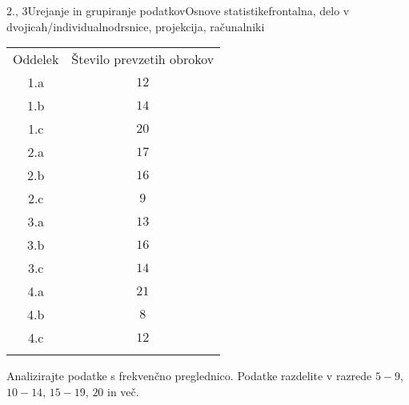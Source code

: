 \begin{priprava}{2., 3}{}{Urejanje in grupiranje podatkov}{Osnove statistike}{frontalna, delo v dvojicah/individualno}{drsnice, projekcija, računalniki}
\begin{naloga}
                            \begin{table}[H]
                                \centering
                                \begin{tabular}{||c|c||} 
                                \hhline{|t:==:t|}
                                \rowcolor[rgb]{0.843,0.718,0.718} 
                                Oddelek  & Število prevzetih obrokov   \\ 
                                \hhline{|:==:|}
                                1.a & $12$    \\ 
                                \hline
                                1.b & $14$    \\ 
                                \hline
                                1.c & $20$    \\ 
                                \hline
                                2.a & $17$     \\
                                \hline
                                2.b & $16$     \\
                                \hline
                                2.c & $9$     \\
                                \hline
                                3.a & $13$     \\
                                \hline
                                3.b & $16$     \\
                                \hline
                                3.c & $14$     \\
                                \hline
                                4.a & $21$     \\                    
                                \hline
                                4.b  & $8$     \\
                                \hline
                                4.c  & $12$     \\
                                \hhline{|b:==:b|}
                                \end{tabular}
                            \end{table}
                        
                        Analizirajte podatke s frekvenčno preglednico.
                        Podatke razdelite v razrede $5-9$, $10-14$, $15-19$, $20$ in več.
                    \end{naloga}

                


\end{priprava}
